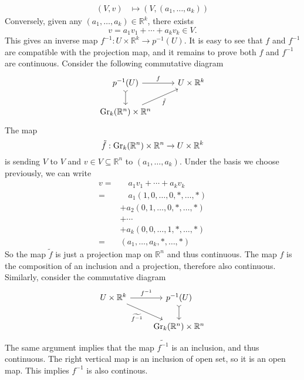 \documentclass[letterpaper, 12pt]{article}
\begin{document}
\begin{solution}
\begin{align*}
     (V,v)&\mapsto (V,(a_1,\ldots,a_k))
\end{align*}
Conversely, given any \((a_1,\ldots, a_k)\in \mathbb{R}^k\), there exists 
\[v=a_1v_1+\cdots+a_kv_k\in V.\]
This gives an inverse map \(f^{-1}:U\times \mathbb{R}^k\rightarrow p^{-1}(U)\). It is easy to see that \(f\) and \(f^{-1}\) are compatible with the projection map, and it remains to prove both \(f\) and \(f^{-1}\) are continuous. Consider the following commutative diagram 
\[\begin{tikzcd}
	{p^{-1}(U)} & {U\times \mathbb{R}^k} \\
	{\text{Gr}_k(\mathbb{R}^n)\times \mathbb{R}^n}
	\arrow["f", from=1-1, to=1-2]
	\arrow[tail, from=1-1, to=2-1]
	\arrow["{\tilde{f}}"', from=2-1, to=1-2]
\end{tikzcd}\]
The map 
\[\tilde{f}:\text{Gr}_k(\mathbb{R}^n)\times \mathbb{R}^n\rightarrow U\times \mathbb{R}^k\] 
is sending \(V\) to \(V\) and \(v\in V\subseteq \mathbb{R}^n\) to \((a_1,\ldots, a_k)\). Under the basis we choose previously, we can write 
\begin{align*}
   v=&\quad a_1v_1+\cdots+a_kv_k\\ 
    =&\quad a_1(1,0,\ldots,0,*,\ldots,*)\\ 
     &+a_2(0,1,\ldots,0,*,\ldots,*)\\
     &+\cdots\\ 
     &+a_k(0,0,\ldots,1,*,\ldots,*)\\ 
    =&(a_1,\ldots,a_k,*,\ldots,*) 
\end{align*}
So the map \(\tilde{f}\) is just a projection map on \(\mathbb{R}^n\) and thus continuous. The map \(f\) is the composition of an inclusion and a projection, therefore also continuous. Similarly, consider the commutative diagram 
\[\begin{tikzcd}
	{U\times \mathbb{R}^k} & {p^{-1}(U)} \\
	& {\text{Gr}_k(\mathbb{R}^n)\times \mathbb{R}^n}
	\arrow["{f^{-1}}", from=1-1, to=1-2]
	\arrow["{\widetilde{f^{-1}}}"', from=1-1, to=2-2]
	\arrow[tail, from=1-2, to=2-2]
\end{tikzcd}\]
The same argument implies that the map \(\widetilde{f^{-1}}\) is an inclusion, and thus continuous. The right vertical map is an inclusion of open set, so it is an open map. This implies \(f^{-1}\) is also continous. 
\end{solution}
\end{document}
